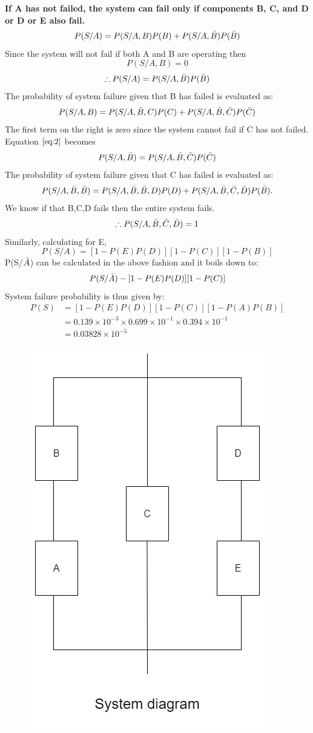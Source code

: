 \documentclass{article}
\begin{document}
\begin{itemize}
  \textbf{If A has not failed, the system can fail only if components B, C, and D or D or E also fail.}
  \[P(S/A) = P(S/A, B) P(B) + P(S/A,\Bar{B}) P(\Bar{B})\]
  Since the system will not fail if both A and B are operating then
  \[P(S/A, B) = 0\]
  \[\therefore  P(S/A) =  P(S/A,\Bar{B}) P(\Bar{B})\]
  The probability of system failure given that B has failed is evaluated
  as:
  \[P(S/A, B) = P(S/A, \Bar{B}, C) P(C) + P(S/A, \Bar{B}, \Bar{C}) P(\Bar{C})\]
  The first term on the right is zero since the system cannot fail if C
  has not failed. Equation $\ref{eq:2}$ becomes
  \[P(S/A, \Bar{B}) =  P(S/A, \Bar{B}, \Bar{C}) P(\Bar{C})\]
  The probability of system failure given that C has failed is evaluated
  as:
  \[P(S/A,\Bar{B}, \Bar{B}) = P(S/A, \Bar{B}, \Bar{B}, D) P(D) + P(S/A, \Bar{B}, \Bar{C}, \Bar{D}) P(\Bar{B}).\]
  We know if that B,C,D fails then the entire system fails.
  \[\therefore P(S/A, \Bar{B}, \Bar{C}, \Bar{D}) = 1\]
  Similarly, calculating for E,
  \[P(S/A) = [1 - P(E)P(D)][1 - P(C)][1 - P(B)]\]
  P(S/$\Bar{A}$) can be calculated in the above fashion and it boils down to:
  \[P(S/\Bar{A}) - [1 - P(E)P(D)][1 - P(C)]\]
  System failure probability is thus given by:
  \textbf{\begin{align*}
      P(S) &= [1 - P(E)P(D)][1 - P(C)][1 - P(A)P(B)]\\
      &= 0.139 \times 10^{-3} \times 0.699 \times 10^{-1} \times 0.394 \times 10^{-1}\\
      &=0.03828 \times 10^{-5}
  \end{align*}}
  \begin{figure}
    \centering
    \includegraphics[scale=0.5]{System.jpg}

\end{figure}
\end{itemize}
\end{document}
